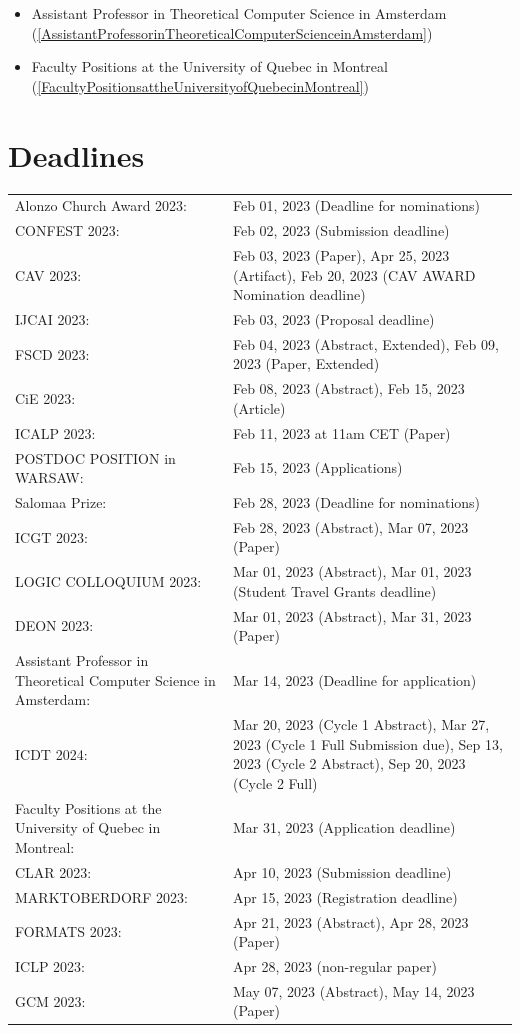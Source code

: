 \documentclass[prodmode,acmtecs]{acmsmall} %
\begin{document}
\begin{itemize}
\begin{itemize}\item Assistant Professor in Theoretical Computer Science in Amsterdam (\cref{AssistantProfessorinTheoreticalComputerScienceinAmsterdam})
\item Faculty Positions at the University of Quebec in Montreal (\cref{FacultyPositionsattheUniversityofQuebecinMontreal})
\end{itemize} 
\end{itemize}\section{Deadlines}\label{deadlines}\begin{tabulary}{\linewidth}{LL}Alonzo Church Award 2023:  & Feb 01, 2023 (Deadline for nominations) \\
CONFEST 2023:  & Feb 02, 2023 (Submission deadline) \\
CAV 2023:  & Feb 03, 2023 (Paper), Apr 25, 2023 (Artifact), Feb 20, 2023 (CAV AWARD Nomination deadline) \\
IJCAI 2023:  & Feb 03, 2023 (Proposal  deadline) \\
FSCD 2023:  & Feb 04, 2023 (Abstract, Extended), Feb 09, 2023 (Paper, Extended) \\
CiE 2023:  & Feb 08, 2023 (Abstract), Feb 15, 2023 (Article) \\
ICALP 2023:  & Feb 11, 2023 at 11am CET (Paper) \\
POSTDOC POSITION in WARSAW:  & Feb 15, 2023 (Applications) \\
Salomaa Prize:  & Feb 28, 2023 (Deadline for nominations) \\
ICGT 2023:  & Feb 28, 2023 (Abstract), Mar 07, 2023 (Paper) \\
LOGIC COLLOQUIUM 2023:  & Mar 01, 2023 (Abstract), Mar 01, 2023 (Student Travel Grants deadline) \\
DEON 2023:  & Mar 01, 2023 (Abstract), Mar 31, 2023 (Paper) \\
Assistant Professor in Theoretical Computer Science in Amsterdam:  & Mar 14, 2023 (Deadline for application) \\
ICDT 2024:  & Mar 20, 2023 (Cycle 1 Abstract), Mar 27, 2023 (Cycle 1 Full Submission due), Sep 13, 2023 (Cycle 2 Abstract), Sep 20, 2023 (Cycle 2 Full) \\
Faculty Positions at the University of Quebec in Montreal:  & Mar 31, 2023 (Application deadline) \\
CLAR 2023:  & Apr 10, 2023 (Submission deadline) \\
MARKTOBERDORF 2023:  & Apr 15, 2023 (Registration deadline) \\
FORMATS 2023:  & Apr 21, 2023 (Abstract), Apr 28, 2023 (Paper) \\
ICLP 2023:  & Apr 28, 2023 (non-regular paper) \\
GCM 2023:  & May 07, 2023 (Abstract), May 14, 2023 (Paper) \\
\end{tabulary}
\end{document}
